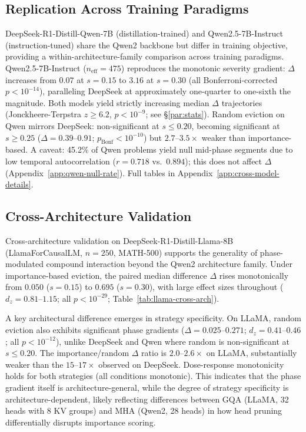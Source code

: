 \subsection{Replication Across Training Paradigms}
\label{sec:cross-model}

DeepSeek-R1-Distill-Qwen-7B (distillation-trained) and Qwen2.5-7B-Instruct (instruction-tuned) share the Qwen2 backbone but differ in training objective, providing a within-architecture-family comparison across training paradigms.
Qwen2.5-7B-Instruct ($n_{\text{eff}}{=}475$) reproduces the monotonic severity gradient: $\Delta$ increases from $0.07$ at $s{=}0.15$ to $3.16$ at $s{=}0.30$ (all Bonferroni-corrected $p < 10^{-14}$), paralleling DeepSeek at approximately one-quarter to one-sixth the magnitude. Both models yield strictly increasing median $\Delta$ trajectories (Jonckheere-Terpstra $z \geq 6.2$, $p < 10^{-9}$; see \S\ref{par:stats}). Random eviction on Qwen mirrors DeepSeek: non-significant at $s \leq 0.20$, becoming significant at $s \geq 0.25$ ($\Delta{=}0.39$--$0.91$; $p_{\text{Bonf}} < 10^{-10}$) but $2.7$--$3.5{\times}$ weaker than importance-based. A caveat: 45.2\% of Qwen problems yield null mid-phase segments due to low temporal autocorrelation ($r{=}0.718$ vs.\ $0.894$); this does not affect $\Delta$ (Appendix~\ref{app:qwen-null-rate}). Full tables in Appendix~\ref{app:cross-model-details}.

\subsection{Cross-Architecture Validation}
\label{sec:cross-arch}

Cross-architecture validation on DeepSeek-R1-Distill-Llama-8B (LlamaForCausalLM, $n{=}250$, MATH-500) supports the generality of phase-modulated compound interaction beyond the Qwen2 architecture family. Under importance-based eviction, the paired median difference $\Delta$ rises monotonically from $0.050$ ($s{=}0.15$) to $0.695$ ($s{=}0.30$), with large effect sizes throughout ($d_z{=}0.81$--$1.15$; all $p < 10^{-29}$; Table~\ref{tab:llama-cross-arch}).

A key architectural difference emerges in strategy specificity. On LLaMA, random eviction also exhibits significant phase gradients ($\Delta{=}0.025$--$0.271$; $d_z{=}0.41$--$0.46$; all $p < 10^{-12}$), unlike DeepSeek and Qwen where random is non-significant at $s \leq 0.20$. The importance/random $\Delta$ ratio is $2.0$--$2.6{\times}$ on LLaMA, substantially weaker than the $15$--$17{\times}$ observed on DeepSeek. Dose-response monotonicity holds for both strategies (all conditions monotonic). This indicates that the phase gradient itself is architecture-general, while the degree of strategy specificity is architecture-dependent, likely reflecting differences between GQA (LLaMA, 32 heads with 8 KV groups) and MHA (Qwen2, 28 heads) in how head pruning differentially disrupts importance scoring.

